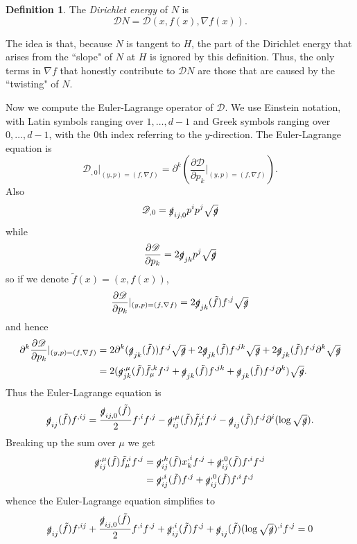 \documentclass[reqno,12pt,letterpaper]{amsart}
\newcommand{\Dir}{\mathscr D}
\newcommand{\dfn}[1]{\emph{#1}\index{#1}}
\theoremstyle{definition}
\newtheorem{definition}[theorem]{Definition}
\numberwithin{equation}{section}
\begin{document}
\begin{definition}
The \dfn{Dirichlet energy} of $N$ is
$$\Dir N = \Dir(x, f(x), \nabla f(x)).$$
\end{definition}
The idea is that, because $N$ is tangent to $H$, the part of the Dirichlet energy that arises from the ``slope" of $N$ at $H$ is ignored by this definition.
Thus, the only terms in $\nabla f$ that honestly contribute to $\Dir N$ are those that are caused by the ``twisting" of $N$.

Now we compute the Euler-Lagrange operator of $\Dir$.
We use Einstein notation, with Latin symbols ranging over $1, \dots, d - 1$ and Greek symbols ranging over $0, \dots, d - 1$, with the $0$th index referring to the $y$-direction.
The Euler-Lagrange equation is
$$\Dir_{,0}|_{(y, p) = (f, \nabla f)} = \partial^k \left(\frac{\partial \Dir}{\partial p_k}|_{(y, p) = (f, \nabla f)}\right).$$
Also
$$\Dir_{,0} = \slashed g_{ij,0} p^i p^j \sqrt{\slashed g}$$
while
$$\frac{\partial \Dir}{\partial p_k} = 2\slashed g_{jk} p^j \sqrt{\slashed g}$$
so if we denote $\tilde f(x) = (x, f(x))$,
$$\frac{\partial \Dir}{\partial p_k}|_{(y, p) = (f, \nabla f)} = 2\slashed g_{jk}(\tilde f) f^{,j} \sqrt{\slashed g}$$
and hence
\begin{align*}
\partial^k \frac{\partial \Dir}{\partial p_k}|_{(y, p) = (f, \nabla f)}
&= 2\partial^k(\slashed g_{jk}(\tilde f)) f^{,j} \sqrt{\slashed g} + 2\slashed g_{jk}(\tilde f) f^{,jk} \sqrt{\slashed g} + 2\slashed g_{jk}(\tilde f) f^{,j} \partial^k \sqrt{\slashed g}\\
&= 2(\slashed g_{jk}^{,\mu} (\tilde f) \tilde f_\mu^{,k} f^{,j} + \slashed g_{jk}(\tilde f) f^{,jk} + \slashed g_{jk}(\tilde f) f^{,j} \partial^k) \sqrt{\slashed g}.
\end{align*}
Thus the Euler-Lagrange equation is
$$\slashed g_{ij}(\tilde f) f^{,ij} = \frac{\slashed g_{ij,0}(\tilde f)}{2} f^{,i} f^{,j} - \slashed g_{ij}^{,\mu} (\tilde f) \tilde f_\mu^{,i} f^{,j} - \slashed g_{ij}(\tilde f) f^{,j} \partial^i (\log \sqrt{\slashed g}).$$
Breaking up the sum over $\mu$ we get
\begin{align*}
\slashed g_{ij}^{,\mu} (\tilde f) \tilde f_\mu^{,i} f^{,j}
&= \slashed g_{ij}^{,k} (\tilde f) x_k^{,i} f^{,j} + \slashed g_{ij}^{,0} (\tilde f) f^{,i} f^{,j} \\
&= \slashed g_{ij}^{,i} (\tilde f) f^{,j} + \slashed g_{ij}^{,0} (\tilde f) f^{,i} f^{,j}
\end{align*}
whence the Euler-Lagrange equation simplifies to
$$\slashed g_{ij}(\tilde f) f^{,ij} + \frac{\slashed g_{ij, 0} (\tilde f)}{2} f^{,i} f^{,j} + \slashed g^{,i}_{ij}(\tilde f) f^{,j} + \slashed g_{ij}(\tilde f) (\log \sqrt{\slashed g})^{,i} f^{,j} = 0$$
\end{document}
